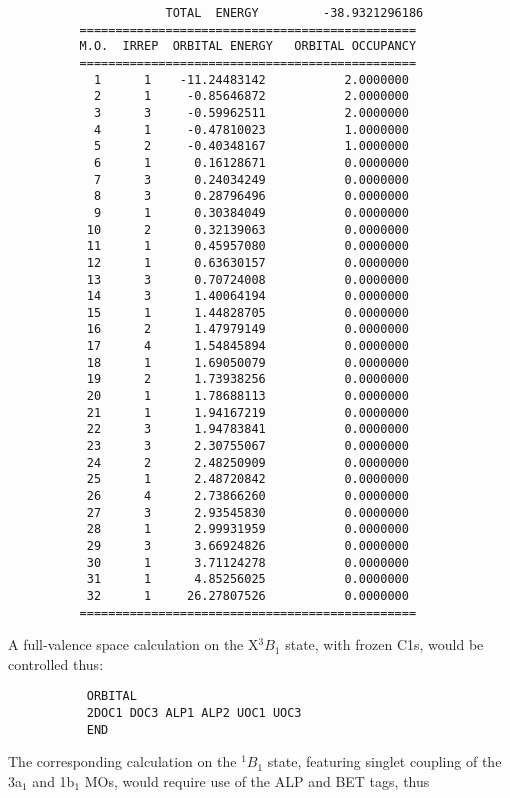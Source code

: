 \documentclass[11pt,fleqn]{article}
\begin{document}
{
\footnotesize
\begin{verbatim}
                      TOTAL  ENERGY         -38.9321296186
          ===============================================
          M.O.  IRREP  ORBITAL ENERGY   ORBITAL OCCUPANCY
          ===============================================
            1      1    -11.24483142           2.0000000
            2      1     -0.85646872           2.0000000
            3      3     -0.59962511           2.0000000
            4      1     -0.47810023           1.0000000
            5      2     -0.40348167           1.0000000
            6      1      0.16128671           0.0000000
            7      3      0.24034249           0.0000000
            8      3      0.28796496           0.0000000
            9      1      0.30384049           0.0000000
           10      2      0.32139063           0.0000000
           11      1      0.45957080           0.0000000
           12      1      0.63630157           0.0000000
           13      3      0.70724008           0.0000000
           14      3      1.40064194           0.0000000
           15      1      1.44828705           0.0000000
           16      2      1.47979149           0.0000000
           17      4      1.54845894           0.0000000
           18      1      1.69050079           0.0000000
           19      2      1.73938256           0.0000000
           20      1      1.78688113           0.0000000
           21      1      1.94167219           0.0000000
           22      3      1.94783841           0.0000000
           23      3      2.30755067           0.0000000
           24      2      2.48250909           0.0000000
           25      1      2.48720842           0.0000000
           26      4      2.73866260           0.0000000
           27      3      2.93545830           0.0000000
           28      1      2.99931959           0.0000000
           29      3      3.66924826           0.0000000
           30      1      3.71124278           0.0000000
           31      1      4.85256025           0.0000000
           32      1     26.27807526           0.0000000
          ===============================================
\end{verbatim}
}
A full-valence space calculation on the X$^{3}B_{1}$ state, with
frozen C1s, would be controlled thus:
{
\footnotesize
\begin{verbatim}
           ORBITAL
           2DOC1 DOC3 ALP1 ALP2 UOC1 UOC3
           END
\end{verbatim}
}
The corresponding calculation on the $^{1}B_{1}$ state,
featuring singlet coupling of the 3a$_{1}$ and 1b$_{1}$ MOs,
would require use of the ALP and BET tags, thus
\end{document}
